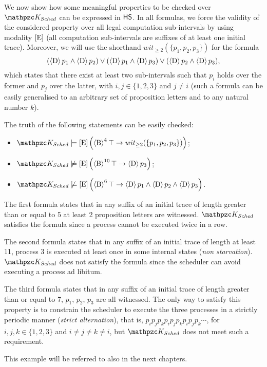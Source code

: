 \begin{example}
We now show how some meaningful properties to be checked over 
$\Ku_{Sched}$ 
can be expressed in $\text{\sffamily HS}$. 
In all formulas, we force the validity of the considered property over all legal computation sub-intervals by using modality $\operatorname{\mathopen[ E \mathclose]}$ (all computation sub-intervals are suffixes of at least one initial trace). Moreover, we will use the shorthand $wit_{\geq 2}(\{p_1,p_2,p_3\})$ for the formula
\begin{equation*}
(\operatorname{\langle D\rangle} p_1\wedge \operatorname{\langle D\rangle} p_2)\vee (\operatorname{\langle D\rangle} p_1\wedge \operatorname{\langle D\rangle} p_3)\vee (\operatorname{\langle D\rangle} p_2\wedge \operatorname{\langle D\rangle} p_3),
\end{equation*}
which states that there exist at least two sub-intervals such that $p_i$ holds over the former and $p_j$ over the latter, with $i,j\in\{1,2,3\}$ and $j\neq i$ (such a formula can be easily generalised to an arbitrary set of proposition letters and to any natural number $k$).

The truth of the following statements can be easily checked:
\begin{itemize}
    \item $\Ku_{Sched}\models\hsEu\left(\hsB^4\top\rightarrow wit_{\geq 2}(\{p_1,p_2,p_3\})\right)$;
    \item $\Ku_{Sched}\not\models\hsEu\left(\hsB^{10}\top\rightarrow \hsD p_3\right)$;
    \item $\Ku_{Sched}\not\models\hsEu\left(\hsB^6\top\rightarrow \hsD p_1\wedge \hsD p_2\wedge \hsD p_3\right)$.
\end{itemize}

The first formula states that in any suffix of an initial trace of length greater than or equal to 5 at least 2 proposition letters are witnessed. $\Ku_{Sched}$ satisfies the formula since a process cannot be executed twice in a row. 

The second formula states that in any suffix of an initial trace of length at least 11, process 3 is executed at least once in some internal states (\emph{non starvation}). $\Ku_{Sched}$ does not satisfy the formula since the scheduler can avoid executing a process ad libitum. 

The third formula states that in any suffix of an initial trace of length greater than or equal to 7, $p_1$, $p_2$, $p_3$ are all witnessed. The only way to satisfy this property is to constrain the scheduler to execute the three processes in a strictly periodic manner (\emph{strict alternation}), that is, $p_i p_j p_k p_i p_j p_k p_i p_j p_k\cdots$, for $i,j,k \in \{1,2,3\}$ and $i \neq  j \neq  k \neq i$, but $\Ku_{Sched}$ does not meet such a
requirement.

This example will be referred to also in the next chapters.
\end{example}


